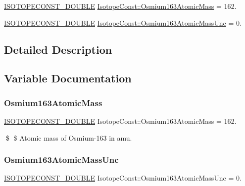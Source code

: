 \begin{DoxyCompactItemize}
\item 
\mbox{\hyperlink{group___isotope_const-_macros_ga8f45a7272ce02c0b4c65c44636ed719a}{I\+S\+O\+T\+O\+P\+E\+C\+O\+N\+S\+T\+\_\+\+D\+O\+U\+B\+LE}} \mbox{\hyperlink{group___isotope_const-_osmium-_os163_ga8c9da09ccefdee7d6ba032effcadd50e}{Isotope\+Const\+::\+Osmium163\+Atomic\+Mass}} = 162.
\item 
\mbox{\hyperlink{group___isotope_const-_macros_ga8f45a7272ce02c0b4c65c44636ed719a}{I\+S\+O\+T\+O\+P\+E\+C\+O\+N\+S\+T\+\_\+\+D\+O\+U\+B\+LE}} \mbox{\hyperlink{group___isotope_const-_osmium-_os163_gacd6f590a7ca5b080cf200d3d1a81a108}{Isotope\+Const\+::\+Osmium163\+Atomic\+Mass\+Unc}} = 0.
\end{DoxyCompactItemize}


\subsection{Detailed Description}


\subsection{Variable Documentation}
\mbox{\label{group___isotope_const-_osmium-_os163_ga8c9da09ccefdee7d6ba032effcadd50e}} 
\subsubsection{\texorpdfstring{Osmium163\+Atomic\+Mass}{Osmium163AtomicMass}}
{\footnotesize\ttfamily \mbox{\hyperlink{group___isotope_const-_macros_ga8f45a7272ce02c0b4c65c44636ed719a}{I\+S\+O\+T\+O\+P\+E\+C\+O\+N\+S\+T\+\_\+\+D\+O\+U\+B\+LE}} Isotope\+Const\+::\+Osmium163\+Atomic\+Mass = 162.}

\$ \$ Atomic mass of Osmium-\/163 in amu. \mbox{\label{group___isotope_const-_osmium-_os163_gacd6f590a7ca5b080cf200d3d1a81a108}} 
\subsubsection{\texorpdfstring{Osmium163\+Atomic\+Mass\+Unc}{Osmium163AtomicMassUnc}}
{\footnotesize\ttfamily \mbox{\hyperlink{group___isotope_const-_macros_ga8f45a7272ce02c0b4c65c44636ed719a}{I\+S\+O\+T\+O\+P\+E\+C\+O\+N\+S\+T\+\_\+\+D\+O\+U\+B\+LE}} Isotope\+Const\+::\+Osmium163\+Atomic\+Mass\+Unc = 0.}

